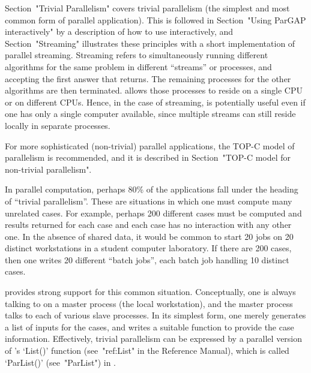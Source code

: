 

Section~"Trivial Parallelism" covers trivial  parallelism  (the  simplest
and most common form  of  parallel  application).  This  is  followed  in
Section~"Using ParGAP interactively" by  a  description  of  how  to  use
{\ParGAP}  interactively,  and  Section~"Streaming"   illustrates   these
principles with a short implementation of parallel  streaming.  Streaming
refers to  simultaneously  running  different  algorithms  for  the  same
problem in different ``streams'' or processes, and  accepting  the  first
answer that returns. The remaining processes for the other algorithms are
then terminated. {\ParGAP} allows those processes to reside on  a  single
CPU or on different CPUs. Hence, in the case of streaming,  {\ParGAP}  is
potentially useful even if one has  only  a  single  computer  available,
since multiple streams can still reside locally in separate processes.

For more sophisticated (non-trivial)  parallel  applications,  the  TOP-C
model  of  parallelism  is  recommended,   and   it   is   described   in
Section~"TOP-C model for non-trivial parallelism".


In parallel computation, perhaps 80\% of the applications fall under  the
heading of ``trivial parallelism''. These are  situations  in  which  one
must compute many unrelated cases. For  example,  perhaps  200  different
cases must be computed and results returned for each case and  each  case
has no interaction with any other one. In the absence of shared data,  it
would be common to start 20 {\GAP} jobs on 20 distinct workstations in  a
student computer laboratory. If there are 200 cases, then one  writes  20
different ``batch jobs'', each batch job handling 10 distinct cases.

{\ParGAP}  provides   strong   support   for   this   common   situation.
Conceptually, one is always talking to {\ParGAP} on a master process (the
local workstation), and the master process talks to each of various slave
processes. In its simplest form, one merely generates a  list  of  inputs
for the cases, and  writes  a  suitable  function  to  provide  the  case
information. Effectively, trivial  parallelism  can  be  expressed  by  a
parallel version of {\GAP}'s `List()'  function  (see~"ref:List"  in  the
Reference  Manual),  which  is  called  `ParList()'  (see~"ParList")   in
{\ParGAP}.


